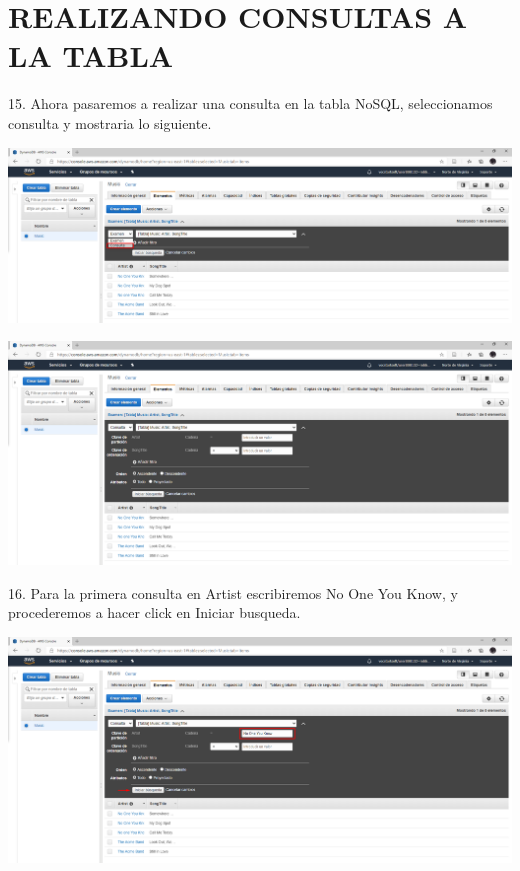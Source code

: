 \documentclass[12pt,letterpaper]{article}
\begin{document}
\section{REALIZANDO CONSULTAS A LA TABLA}
15.	 Ahora pasaremos a realizar una consulta en la tabla NoSQL, seleccionamos consulta y mostraria lo siguiente.
\begin{center}
    \includegraphics[width=15cm]{img/15.png}  
\end{center}
\begin{center}
    \includegraphics[width=15cm]{img/15.1.png}  
\end{center}


16.	Para la primera consulta en Artist escribiremos No One You Know, y procederemos a hacer click en Iniciar busqueda.
\begin{center}
    \includegraphics[width=15cm]{img/16.png}  
\end{center}
\newpage
\end{document}
